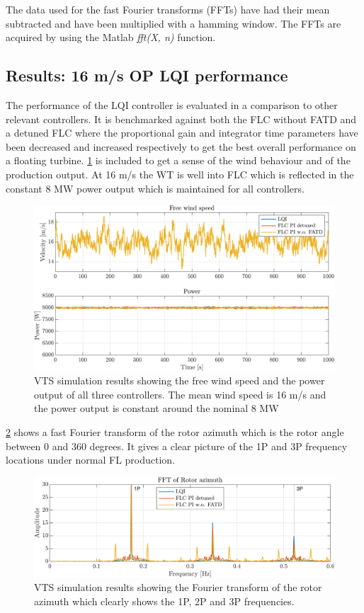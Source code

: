 The data used for the fast Fourier transforms (FFTs) have had their mean subtracted and have been multiplied with a hamming window. The FFTs are acquired by using the Matlab \textit{fft(X, n)} function.

\subsection{Results: 16 m/s OP LQI performance} \label{sec:test_vts_part1}
The performance of the LQI controller is evaluated in a comparison to other relevant controllers. It is benchmarked against both the FLC without FATD and a detuned FLC where the proportional gain and integrator time parameters have been decreased and increased respectively to get the best overall performance on a floating turbine. \cref{fig:vts_1_wind_pow} is included to get a sense of the wind behaviour and of the production output. At 16 m/s the WT is well into FLC which is reflected in the constant 8 MW power output which is maintained for all controllers.
\begin{figure}[ht]
	\centering
	\includegraphics[width=0.7\linewidth]{Graphics/TestResults/VTSplotting/1_wind_pow.png}
	\caption{VTS simulation results showing the free wind speed and the power output of all three controllers. The mean wind speed is 16 m/s and the power output is constant around the nominal 8 MW}
	\label{fig:vts_1_wind_pow}
\end{figure}
\cref{fig:vts_2_fftazi} shows a fast Fourier transform of the rotor azimuth which is the rotor angle between 0 and 360 degrees. It gives a clear picture of the 1P and 3P frequency locations under normal FL production.
\begin{figure}[ht]
	\centering
	\includegraphics[width=0.7\linewidth]{Graphics/TestResults/VTSplotting/2_fftazi.png}
	\caption{VTS simulation results showing the Fourier transform of the rotor azimuth which clearly shows the 1P, 2P and 3P frequencies.}
	\label{fig:vts_2_fftazi}
\end{figure}

